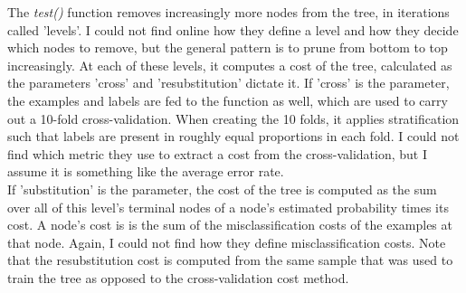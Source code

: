 The \emph{test()} function removes increasingly more nodes from the tree, in iterations called 'levels'.
I could not find online how they define a level and how they decide which nodes to remove,
but the general pattern is to prune from bottom to top increasingly.
At each of these levels, it computes a cost of the tree, calculated as the parameters 'cross' and 'resubstitution' dictate it.
If 'cross' is the parameter, the examples and labels are fed to the function as well, which are used to carry out a 10-fold
cross-validation. When creating the 10 folds, it applies stratification such that labels are present in roughly equal proportions
in each fold. I could not find which metric they use to extract a cost from the cross-validation, but I assume it is something
like the average error rate.\\
If 'substitution' is the parameter, the cost of the tree is computed as the sum over all of this level's terminal
nodes of a node's estimated probability times its cost.
A node's cost is is the sum of the misclassification costs of the examples at that node.
Again, I could not find how they define misclassification costs.
Note that the resubstitution cost is computed from the same sample that was used to train the tree as opposed to the cross-validation
cost method.




